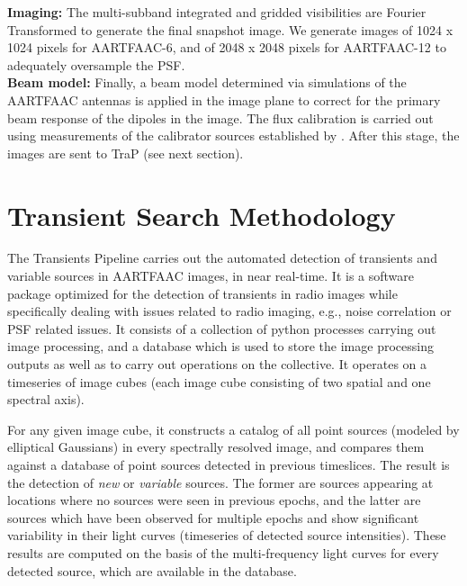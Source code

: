 \documentclass{ws-jai}
\begin{document}
\noindent   \textbf  {Imaging:}   The  multi-subband   integrated  and   gridded
visibilities are  Fourier Transformed to  generate the final snapshot  image. We
generate images of 1024 x 1024 pixels  for AARTFAAC-6, and of 2048 x 2048 pixels
for AARTFAAC-12 to adequately oversample the PSF. \\

\noindent \textbf {Beam model:} Finally, a beam model determined via simulations
of  the AARTFAAC  antennas is  applied in  the image  plane to  correct for  the
primary beam  response of  the dipoles  in the image.   The flux  calibration is
carried out using  measurements of the calibrator sources  established by \citet
{scaife2012broad}.  After  this stage,  the images  are sent  to TraP  (see next
section).

\section {\label{sec:afaac_trap} Transient Search Methodology}
The  Transients  Pipeline  \citep[TraP;][]{swinbank2015lofar}  carries  out  the
automated detection  of transients and  variable sources in AARTFAAC  images, in
near  real-time.  It  is  a  software package  optimized  for  the detection  of
transients in  radio images  while specifically dealing  with issues  related to
radio imaging, e.g., noise correlation or  PSF related issues.  It consists of a
collection of  python processes  carrying out image  processing, and  a database
which is  used to store  the image  processing outputs as  well as to  carry out
operations on the collective.  It operates  on a timeseries of image cubes (each
image cube consisting of two spatial and one spectral axis).

For any given image cube, it constructs  a catalog of all point sources (modeled
by elliptical Gaussians)  in every spectrally resolved image,  and compares them
against a database of point sources detected in previous timeslices.  The result
is the detection  of \textit{new} or \textit{variable} sources.   The former are
sources appearing  at locations where no  sources were seen in  previous epochs,
and the latter are sources which have been observed for multiple epochs and show
significant variability  in their  light curves  (timeseries of  detected source
intensities). These  results are  computed on the  basis of  the multi-frequency
light curves for every detected source, which are available in the database.
\end{document}
